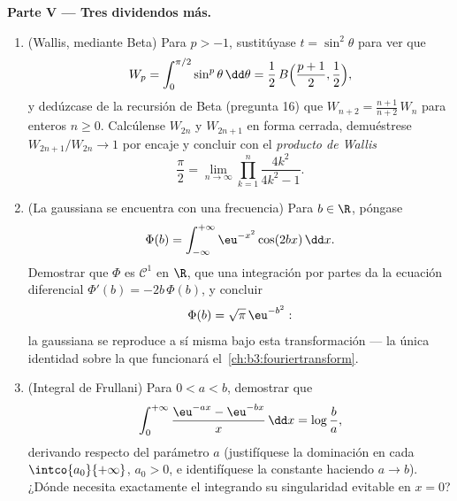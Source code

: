 \begin{problem}
\medskip
\noindent\textbf{Parte V --- Tres dividendos más.}
\begin{enumerate}[resume]
  \item (Wallis, mediante Beta) Para $p > -1$, sustitúyase $t =
        \sin^2\theta$ para ver que
        \[
        W_p = \int_0^{\pi/2}\sin^p\theta\,\dd\theta
        = \frac12\,B\Bigl(\frac{p+1}2, \frac12\Bigr),
        \]
        y dedúzcase de la recursión de Beta (pregunta 16) que
        $W_{n+2} = \frac{n+1}{n+2}\,W_n$ para enteros $n \geq
        0$. Calcúlense $W_{2n}$ y $W_{2n+1}$ en forma cerrada,
        demuéstrese $W_{2n+1}/W_{2n} \to 1$ por encaje y concluir con el
        \emph{producto de Wallis}
        \[
        \frac\pi2 = \lim_{n\to\infty}
        \prod_{k=1}^{n}\frac{4k^2}{4k^2 - 1} .
        \]
  \item (La gaussiana se encuentra con una frecuencia) Para $b \in \R$,
  póngase
        \[
        \Phi(b) = \int_{-\infty}^{+\infty}
        \eu^{-x^2}\cos(2bx)\,\dd x .
        \]
        Demostrar que $\Phi$ es $\mathcal C^1$ en $\R$, que una
        integración por partes da la ecuación diferencial
        $\Phi'(b) = -2b\,\Phi(b)$, y concluir
        \[
        \Phi(b) = \sqrt\pi\,\eu^{-b^2} :
        \]
        la gaussiana se reproduce a sí misma bajo esta transformación
        --- la única identidad sobre la que funcionará
        el~\cref{ch:b3:fouriertransform}. \item (Integral de Frullani)
        Para $0 < a < b$, demostrar que
        \[
        \int_0^{+\infty}
        \frac{\eu^{-ax} - \eu^{-bx}}{x}\,\dd x
        = \log\frac ba ,
        \]
        derivando respecto del parámetro $a$ (justifíquese la dominación
        en cada $\intco{a_0}{+\infty}$, $a_0 > 0$, e identifíquese la
        constante haciendo $a \to b$). ¿Dónde necesita exactamente el
        integrando su singularidad evitable en $x = 0$?
\end{enumerate}
\end{problem}
